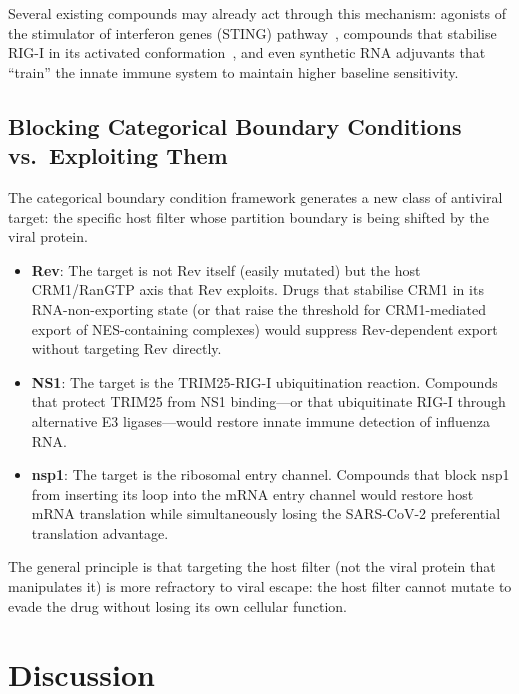 Several existing compounds may already act through this mechanism: agonists of the stimulator of interferon genes (STING) pathway~\cite{Ablasser2013}, compounds that stabilise RIG-I in its activated conformation~\cite{Choudhury2019}, and even synthetic RNA adjuvants that ``train'' the innate immune system to maintain higher baseline sensitivity.

\subsection{Blocking Categorical Boundary Conditions vs.\ Exploiting Them}

The categorical boundary condition framework generates a new class of antiviral target: the specific host filter whose partition boundary is being shifted by the viral protein.

\begin{itemize}
  \item \textbf{Rev}: The target is not Rev itself (easily mutated) but the host CRM1/RanGTP axis that Rev exploits. Drugs that stabilise CRM1 in its RNA-non-exporting state (or that raise the threshold for CRM1-mediated export of NES-containing complexes) would suppress Rev-dependent export without targeting Rev directly.
  \item \textbf{NS1}: The target is the TRIM25-RIG-I ubiquitination reaction. Compounds that protect TRIM25 from NS1 binding---or that ubiquitinate RIG-I through alternative E3 ligases---would restore innate immune detection of influenza RNA.
  \item \textbf{nsp1}: The target is the ribosomal entry channel. Compounds that block nsp1 from inserting its loop into the mRNA entry channel would restore host mRNA translation while simultaneously losing the SARS-CoV-2 preferential translation advantage.
\end{itemize}

The general principle is that targeting the host filter (not the viral protein that manipulates it) is more refractory to viral escape: the host filter cannot mutate to evade the drug without losing its own cellular function.

\section{Discussion}
\label{v:sec:discussion}

